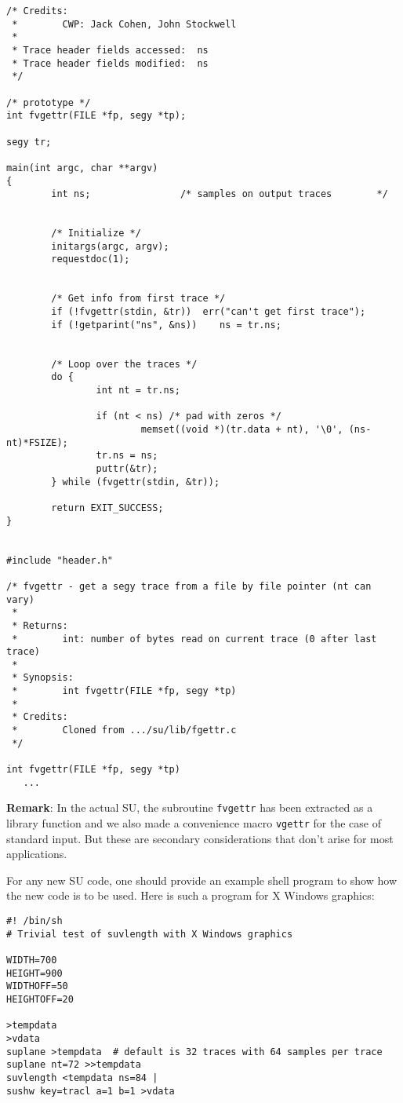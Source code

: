 {{{{{{{{\begin{verbatim}
/* Credits:
 *        CWP: Jack Cohen, John Stockwell
 *
 * Trace header fields accessed:  ns
 * Trace header fields modified:  ns
 */

/* prototype */
int fvgettr(FILE *fp, segy *tp);

segy tr;

main(int argc, char **argv)
{
        int ns;                /* samples on output traces        */


        /* Initialize */
        initargs(argc, argv);
        requestdoc(1);


        /* Get info from first trace */ 
        if (!fvgettr(stdin, &tr))  err("can't get first trace"); 
        if (!getparint("ns", &ns))    ns = tr.ns;


        /* Loop over the traces */
        do {
                int nt = tr.ns;
                                
                if (nt < ns) /* pad with zeros */
                        memset((void *)(tr.data + nt), '\0', (ns-nt)*FSIZE);
                tr.ns = ns;
                puttr(&tr);
        } while (fvgettr(stdin, &tr));
        
        return EXIT_SUCCESS;
}


#include "header.h"

/* fvgettr - get a segy trace from a file by file pointer (nt can vary)
 *
 * Returns:
 *        int: number of bytes read on current trace (0 after last trace)
 *
 * Synopsis:
 *        int fvgettr(FILE *fp, segy *tp)
 *
 * Credits:
 *        Cloned from .../su/lib/fgettr.c
 */

int fvgettr(FILE *fp, segy *tp)
   ...
\end{verbatim}}\noindent
{\bf Remark}: In the actual {\small\sf SU}, the subroutine {\tt fvgettr} has been
extracted as a library function and we also made a convenience macro
{\tt vgettr} for the case of standard input.  But these are secondary
considerations that don't arise for most applications.

For any new {\small\sf SU} code, one should provide an example shell program to show how
the new code is to be used.  Here is such a program for X Windows graphics:
{\small\begin{verbatim}
#! /bin/sh
# Trivial test of suvlength with X Windows graphics

WIDTH=700
HEIGHT=900
WIDTHOFF=50
HEIGHTOFF=20

>tempdata
>vdata
suplane >tempdata  # default is 32 traces with 64 samples per trace
suplane nt=72 >>tempdata
suvlength <tempdata ns=84 |
sushw key=tracl a=1 b=1 >vdata


\end{verbatim}}}}}}}}}
